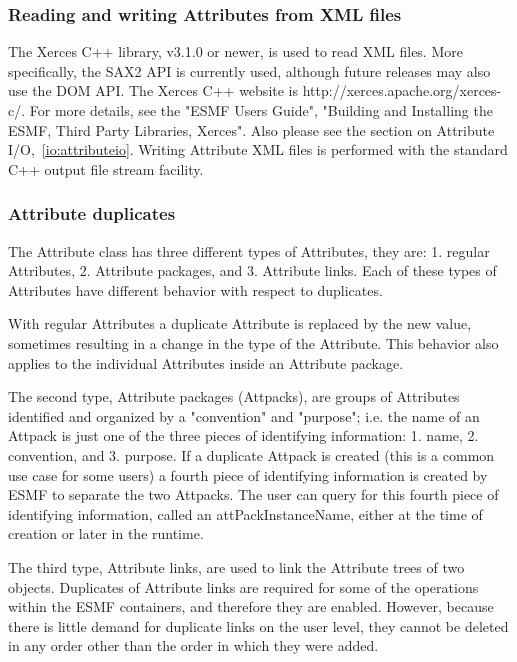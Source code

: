 \subsubsection{Reading and writing Attributes from XML files}
\label{Att:Xerces}

\begin{sloppypar}
The Xerces C++ library, v3.1.0 or newer, is used to read XML files.
More specifically, the SAX2 API is currently used, although future releases may 
also use the DOM API.  The Xerces C++ website is 
http://xerces.apache.org/xerces-c/.  For more details, see the 
"ESMF Users Guide", "Building and Installing the ESMF, Third Party Libraries,
Xerces".  Also please see the section on Attribute I/O,~\ref{io:attributeio}.  
Writing Attribute XML files is performed with the standard C++ output file 
stream facility.
\end{sloppypar}

\subsubsection{Attribute duplicates}

The Attribute class has three different types of Attributes, they are: 1. regular Attributes, 2. Attribute packages, and 3. Attribute links.  Each of these types of Attributes have different behavior with respect to duplicates.

With regular Attributes a duplicate Attribute is replaced by the new value, sometimes resulting in a change in the type of the Attribute.  This behavior also applies to the individual Attributes inside an Attribute package.

The second type, Attribute packages (Attpacks), are groups of Attributes identified and organized by a "convention" and "purpose";  i.e. the name of an Attpack is just one of the three pieces of identifying information: 1. name, 2. convention, and 3. purpose.  If a duplicate Attpack is created (this is a common use case for some users) a fourth piece of identifying information is created by ESMF to separate the two Attpacks. The user can query for this fourth piece of identifying information, called an attPackInstanceName, either at the time of creation or later in the runtime.

The third type, Attribute links, are used to link the Attribute trees of two objects.  Duplicates of Attribute links are required for some of the operations within the ESMF containers, and therefore they are enabled.  However, because there is little demand for duplicate links on the user level, they cannot be deleted in any order other than the order in which they were added.
